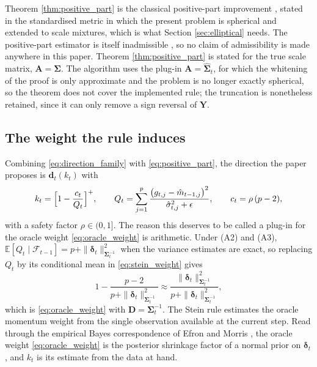 \documentclass[pdflatex,sn-mathphys-num]{sn-jnl}%
\theoremstyle{thmstyleone}%
\theoremstyle{thmstyletwo}%
\theoremstyle{thmstylethree}%
\newcommand{\rev}[1]{{\color{blue}#1}}
\newcommand{\E}{\mathbb{E}}
\begin{document}
Theorem \ref{thm:positive_part} is the classical positive-part improvement \cite{baranchik1970, lehmann1998}, stated in the standardised metric in which the present problem is spherical and extended to scale mixtures, which is what Section \ref{sec:elliptical} needs. The positive-part estimator is itself inadmissible \cite{shao1994}, so no claim of admissibility is made anywhere in this paper. \rev{Theorem \ref{thm:positive_part} is stated for the true scale matrix, $\bm A=\bm\Sigma$. The algorithm uses the plug-in $\bm A=\widehat{\bm\Sigma}_t$, for which the whitening of the proof is only approximate and the problem is no longer exactly spherical, so the theorem does not cover the implemented rule; the truncation is nonetheless retained, since it can only remove a sign reversal of $\bm Y$.}

\subsection{The weight the rule induces}

Combining \eqref{eq:direction_family} with \eqref{eq:positive_part}, the direction the paper proposes is $\bm d_t(k_t)$ with
\begin{equation}
\label{eq:stein_weight}
k_t=\Bigl[1-\frac{c_t}{Q_t}\Bigr]^{+},
\qquad
Q_t=\sum_{j=1}^{p}\frac{\bigl(g_{t,j}-\hat m_{t-1,j}\bigr)^2}{\hat\sigma^2_{t,j}+\epsilon},
\qquad
c_t=\rho\,(p-2),
\end{equation}
with a safety factor $\rho\in(0,1]$. The reason this deserves to be called a plug-in for the oracle weight \eqref{eq:oracle_weight} is arithmetic. Under (A2) and (A3), $\E[Q_t\mid\mathcal F_{t-1}]=p+\|\bm\delta_t\|^2_{\bm\Sigma_t^{-1}}$ when the variance estimates are exact, so replacing $Q_t$ by its conditional mean in \eqref{eq:stein_weight} gives
\begin{equation}
1-\frac{p-2}{p+\|\bm\delta_t\|^2_{\bm\Sigma_t^{-1}}}
\approx
\frac{\|\bm\delta_t\|^2_{\bm\Sigma_t^{-1}}}{p+\|\bm\delta_t\|^2_{\bm\Sigma_t^{-1}}},
\end{equation}
which is \eqref{eq:oracle_weight} with $\bm D=\bm\Sigma_t^{-1}$. The Stein rule estimates the oracle momentum weight from the single observation available at the current step. Read through the empirical Bayes correspondence of Efron and Morris \cite{efronmorris1973, efron2012}, the oracle weight \eqref{eq:oracle_weight} is the posterior shrinkage factor of a normal prior on $\bm\delta_t$, and $k_t$ is its estimate from the data at hand.
\end{document}
